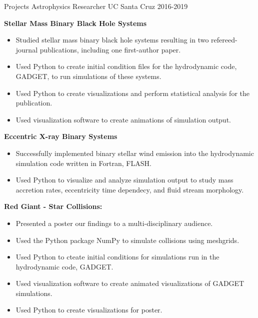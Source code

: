 
\begin{cventries}
	
  \cventry
	{Projects}
	{Astrophysics Researcher \vspace{1mm}}
	{UC Santa Cruz}
	{2016-2019}
	{
		\vspace{0.1cm}
		\begin{cvitems}
			\item {\textbf{Stellar Mass Binary Black Hole Systems}
				\begin{itemize}
					\item Studied stellar mass binary black hole systems resulting in two refereed-journal publications, including one first-author paper.
					\item Used Python to create initial condition files for the hydrodynamic code, GADGET, to run simulations of these systems. 
					\item Used Python to create visualizations and perform statistical analysis for the publication.
					\item Used visualization software to create animations of simulation output.
				\end{itemize}}			
			\item {\textbf{Eccentric X-ray Binary Systems}
				\begin{itemize}
					\item Successfully implemented binary stellar wind emission into the hydrodynamic simulation code written in Fortran, FLASH. 
					\item Used Python to visualize and analyze simulation output to study mass accretion rates, eccentricity time dependecy, and fluid stream morphology.
				\end{itemize}} 
			\item {\textbf{Red Giant - Star Collisions:} 
				\begin{itemize}
				\item Presented a poster our findings to a multi-disciplinary audience.
				\item Used the Python package NumPy to simulate collisions using meshgrids.
				\item Used Python to cteate initial conditions for simulations run in the hydrodynamic code, GADGET.
				\item Used visualization software to create animated visualizations of GADGET simulations.
				\item Used Python to create visualizations for poster. 
				\end{itemize}}
		\end{cvitems}
	}
	  
  
\end{cventries}
